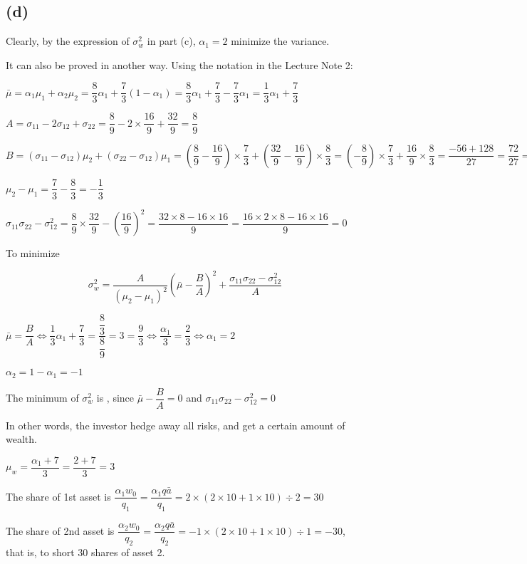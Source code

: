 \documentclass{article}
\begin{document}
\subsection*{(d)}

Clearly, by the expression of $\sigma_{w}^{2}$ in part (c), $\alpha_{1}=2$ minimize the variance.

It can also be proved in another way. Using the notation in the Lecture Note 2:

$\bar{\mu}=\alpha_{1}\mu_{1}+\alpha_{2}\mu_{2}=\dfrac{8}{3}\alpha_{1}+\dfrac{7}{3}\left(1-\alpha_{1}\right)=\dfrac{8}{3}\alpha_{1}+\dfrac{7}{3}-\dfrac{7}{3}\alpha_{1}=\dfrac{1}{3}\alpha_{1}+\dfrac{7}{3}$

$A=\sigma_{11}-2\sigma_{12}+\sigma_{22}=\dfrac{8}{9}-2\times\dfrac{16}{9}+\dfrac{32}{9}=\dfrac{8}{9}$

$B=\left(\sigma_{11}-\sigma_{12}\right)\mu_{2}+\left(\sigma_{22}-\sigma_{12}\right)\mu_{1}=\left(\dfrac{8}{9}-\dfrac{16}{9}\right)\times\dfrac{7}{3}+\left(\dfrac{32}{9}-\dfrac{16}{9}\right)\times\dfrac{8}{3}=\left(-\dfrac{8}{9}\right)\times\dfrac{7}{3}+\dfrac{16}{9}\times\dfrac{8}{3}=\dfrac{-56+128}{27}=\dfrac{72}{27}=\dfrac{8\times9}{3\times9}=\dfrac{8}{3}$

$\mu_{2}-\mu_{1}=\dfrac{7}{3}-\dfrac{8}{3}=-\dfrac{1}{3}$

$\sigma_{11}\sigma_{22}-\sigma_{12}^{2}=\dfrac{8}{9}\times\dfrac{32}{9}-\left(\dfrac{16}{9}\right)^2=\dfrac{32\times8-16\times16}{9}=\dfrac{16\times2\times8-16\times16}{9}=0$

To minimize

$$\sigma_{w}^{2}=\dfrac{A}{\left(\mu_{2}-\mu_{1}\right)^2}\left(\bar{\mu}-\dfrac{B}{A}\right)^2+\dfrac{\sigma_{11}\sigma_{22}-\sigma_{12}^{2}}{A}$$

$\bar{\mu}=\dfrac{B}{A}\iff\dfrac{1}{3}\alpha_{1}+\dfrac{7}{3}=\dfrac{\dfrac{8}{3}}{\dfrac{8}{9}}=3=\dfrac{9}{3}\iff\dfrac{\alpha_{1}}{3}=\dfrac{2}{3}\iff\boxed{\alpha_{1}=2}$

$\boxed{\alpha_{2}=1-\alpha_{1}=-1}$

The minimum of $\sigma_{w}^{2}$ is , since $\bar{\mu}-\dfrac{B}{A}=0$ and $\sigma_{11}\sigma_{22}-\sigma_{12}^{2}=0$

In other words, the investor hedge away all risks, and get a certain amount of wealth.

$\mu_{w}=\dfrac{\alpha_{1}+7}{3}=\dfrac{2+7}{3}=\boxed{3}$

The share of 1st asset is 
$\dfrac{\alpha_{1}w_{0}}{q_{1}}=\dfrac{\alpha_{1}q\bar{a}}{q_{1}}=2\times\left(2\times10+1\times10\right)\div2=\boxed{30}$

The share of 2nd asset is 
$\dfrac{\alpha_{2}w_{0}}{q_{2}}=\dfrac{\alpha_{2}q\bar{a}}{q_{2}}=-1\times\left(2\times10+1\times10\right)\div1=\boxed{-30}$,
that is, to short 30 shares of asset 2.
\end{document}
